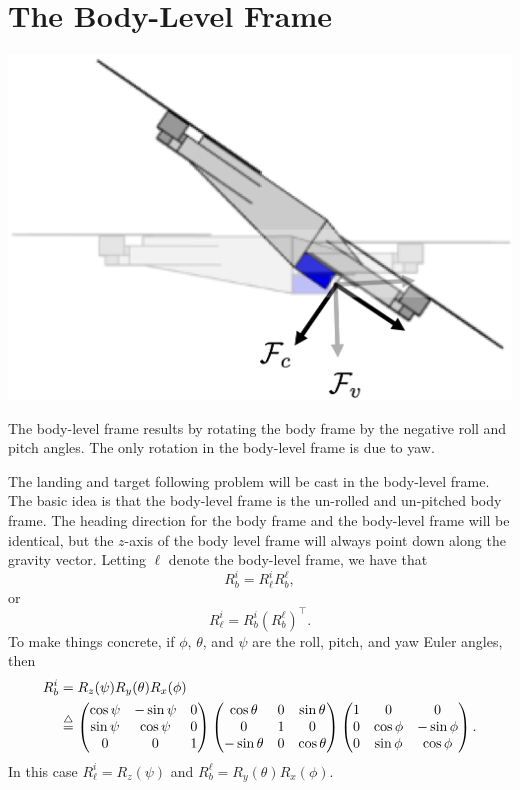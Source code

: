 \section{The Body-Level Frame}
\label{sec:body_level_frame}

\begin{marginfigure}
	\includegraphics[width=\linewidth]{chap9_visual_servoing/figures/body_level_frame}
	\caption{The body-level frame results by rotating the body frame by the negative roll and pitch angles.  The only rotation in the body-level frame is due to yaw.}
	\label{fig:body_level_frame}
\end{marginfigure}

The landing and target following problem will be cast in the body-level frame.  The basic idea is that the body-level frame is the un-rolled and un-pitched body frame.  The heading direction for the body frame and the body-level frame will be identical, but the $z$-axis of the body level frame will always point down along the gravity vector.
Letting $\ell$ denote the body-level frame, we have that
\[
R_b^i = R_\ell^i R_b^\ell,
\]
or 
\[
R_\ell^i =  R_b^i (R_b^\ell)^\top.
\]
To make things concrete, if $\phi$, $\theta$, and $\psi$ are the roll, pitch, and yaw Euler angles, then 
\begin{align*}
R_b^i &= R_z(\psi) R_y(\theta) R_x(\phi) \\
&\stackrel{\triangle}{=} \begin{pmatrix} \cos\psi & -\sin\psi & 0 \\ \sin\psi & \cos\psi & 0 \\ 0 & 0 & 1 \end{pmatrix}
\begin{pmatrix} \cos\theta & 0 & \sin\theta \\ 0 & 1 & 0 \\ -\sin\theta & 0 & \cos\theta \end{pmatrix}
\begin{pmatrix} 1 & 0 & 0 \\ 0 & \cos\phi & -\sin\phi \\ 0 & \sin\phi & \cos\phi \end{pmatrix}.
\end{align*}
In this case $R_\ell^i = R_z(\psi)$ and $R_b^\ell = R_y(\theta)R_x(\phi)$.

